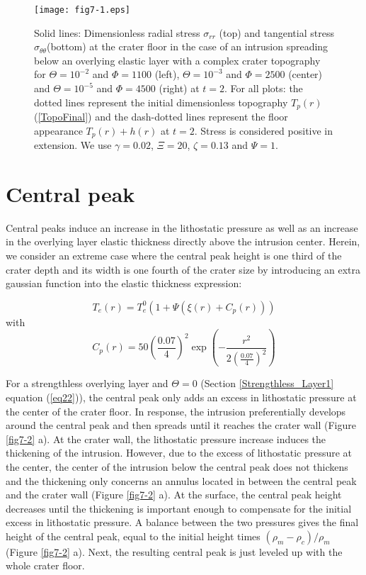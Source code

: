 \begin{article}
\begin{enumerate}
\begin{figure}[h!]
\begin{center} \graphicspath{{/Users/thorey/Documents/These/Submission/Article/FFC_JGR_2013/Paper_APRES_2nd_REVIEW/}}
\texttt{[image: fig7-1.eps]}
\caption{Solid lines: Dimensionless radial stress $\sigma_{rr}$ (top) and tangential stress $\sigma_{\theta \theta}$(bottom) at the crater floor in the case of an intrusion spreading below an overlying elastic layer with a complex crater topography for $\Theta=10^{-2}$ and $\Phi=1100$ (left), $\Theta=10^{-3}$ and $\Phi=2500$ (center) and $\Theta=10^{-5}$ and $\Phi=4500$ (right) at $t=2$. For all plots: the dotted lines represent the initial dimensionless topography $T_p(r)$ (\ref{TopoFinal}) and the dash-dotted lines represent the floor appearance $T_p(r)+h(r)$ at $t=2$. Stress is considered positive in extension. We use $\gamma=0.02$, $\Xi=20$, $\zeta=0.13$ and $\Psi=1$.}
\label{fig7-1}
\end{center}
\end{figure}

\section{Central peak}
\label{AppendixC}

Central peaks induce an increase in the lithostatic pressure as well as an increase in the overlying layer elastic thickness directly above the intrusion center. Herein, we consider an extreme case where the central peak height is one third of the crater depth and its width is one fourth of the crater size by introducing an extra gaussian function into the elastic thickness expression:

\begin{equation}
T_e(r)=T_e^0(1+\Psi(\xi(r)+C_p(r)))
\end{equation}
with
\begin{equation}
C_p(r)=50 \left(\frac{0.07}{4}\right)^2\exp\left(-\frac{r^2}{2(\frac{0.07}{4})^2}\right)
\end{equation}

For a strengthless overlying layer and $\Theta=0$ (Section  \ref{Strengthless_Layer1} equation (\ref{eq22})), the central peak only adds an excess in lithostatic pressure at the center of the crater floor. In response, the intrusion preferentially develops around the central peak and then spreads until it reaches the crater wall (Figure \ref{fig7-2} a). At the crater wall, the lithostatic pressure increase induces the thickening of the intrusion. However, due to the excess of lithostatic pressure at the center, the center of the intrusion below the central peak does not thickens and the thickening only concerns an annulus located in between the central peak and the crater wall (Figure \ref{fig7-2} a). At the surface, the central peak height decreases until the thickening is important enough to compensate for the initial excess in lithostatic pressure. A balance between the two pressures gives the final height of the central peak, equal to the initial height times $(\rho_m-\rho_c)/\rho_m$ (Figure \ref{fig7-2} a). Next, the resulting central peak is just leveled up with the whole crater floor. 


\end{enumerate}
\end{article}
